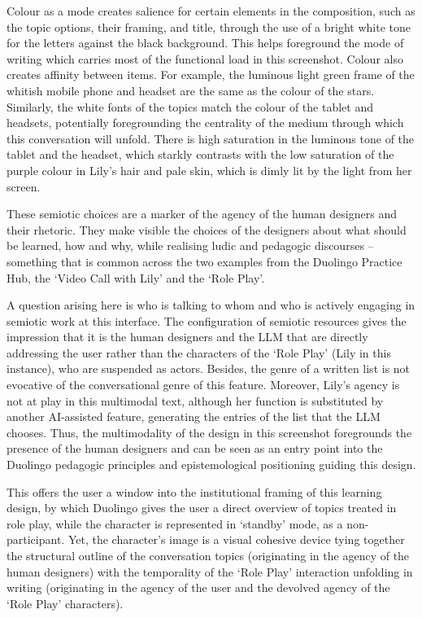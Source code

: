 \documentclass[english]{textolivre}
\begin{document}
\begin{enumerate}[label=\alph*.]
Colour as a mode creates salience for certain elements in the composition, such as the topic options, their framing, and title, through the use of a bright white tone for the letters against the black background. This helps foreground the mode of writing which carries most of the functional load in this screenshot. Colour also creates affinity between items. For example, the luminous light green frame of the whitish mobile phone and headset are the same as the colour of the stars. Similarly, the white fonts of the topics match the colour of the tablet and headsets, potentially foregrounding the centrality of the medium through which this conversation will unfold. There is high saturation in the luminous tone of the tablet and the headset, which starkly contrasts with the low saturation of the purple colour in Lily’s hair and pale skin, which is dimly lit by the light from her screen.

These semiotic choices are a marker of the agency of the human designers and their rhetoric. They make visible the choices of the designers about what should be learned, how and why, while realising ludic and pedagogic discourses – something that is common across the two examples from the Duolingo Practice Hub, the ‘Video Call with Lily’ and the ‘Role Play’.

A question arising here is who is talking to whom and who is actively engaging in semiotic work at this interface. The configuration of semiotic resources gives the impression that it is the human designers and the LLM that are directly addressing the user rather than the characters of the ‘Role Play’ (Lily in this instance), who are suspended as actors. Besides, the genre of a written list is not evocative of the conversational genre of this feature. Moreover, Lily’s agency is not at play in this multimodal text, although her function is substituted by another AI-assisted feature, generating the entries of the list that the LLM chooses. Thus, the multimodality of the design in this screenshot foregrounds the presence of the human designers and can be seen as an entry point into the Duolingo pedagogic principles and epistemological positioning guiding this design.

This offers the user a window into the institutional framing of this learning design, by which Duolingo gives the user a direct overview of topics treated in role play, while the character is represented in ‘standby’ mode, as a non-participant. Yet, the character’s image is a visual cohesive device tying together the structural outline of the conversation topics (originating in the agency of the human designers) with the temporality of the ‘Role Play’ interaction unfolding in writing (originating in the agency of the user and the devolved agency of the ‘Role Play’ characters).


\end{enumerate}
\end{document}
